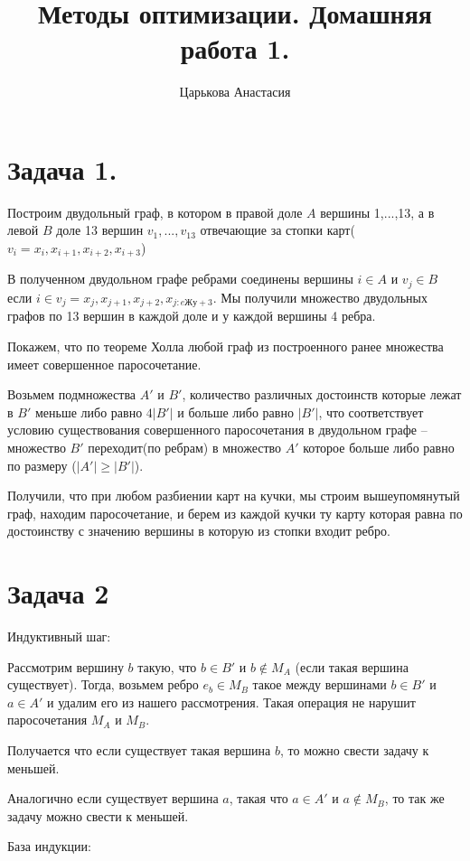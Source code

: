 \documentclass{article}
\title{\vspace{-2em}Методы оптимизации. Домашняя работа 1.}
\author{Царькова Анастасия}
\date{}
\begin{document}
\maketitle

\section{Задача 1.}

Построим двудольный граф, в котором в правой доле $A$ вершины 1,...,13, а в левой $B$ доле 13 вершин $v_1,...,v_{13}$ отвечающие за стопки карт($v_i = {x_i, x_{i+1}, x_{i+2}, x_{i+3}}$)

В полученном двудольном графе ребрами соединены вершины $i \in A$ и $v_j \in B$ если $i \in v_j = {x_j, x_{j+1}, x_{j+2}, x_{j:eЖу
+3}}$.
Мы получили множество двудольных графов по 13 вершин в каждой доле и у каждой вершины 4 ребра.

Покажем, что по теореме Холла любой граф из построенного ранее множества имеет совершенное паросочетание.

Возьмем подмножества $A'$ и $B'$, количество различных достоинств которые лежат в $B'$ меньше либо равно $4|B'|$ и больше либо равно $|B'|$, что соответствует условию существования совершенного паросочетания в двудольном графе -- множество $B'$ переходит(по ребрам) в множество $A'$ которое больше либо равно по размеру ($|A'| \geq |B'|$).


Получили, что при любом разбиении карт на кучки, мы строим вышеупомянутый граф, находим паросочетание, и берем из каждой кучки ту карту которая равна по достоинству с значению вершины в которую из стопки входит ребро.

\section{Задача 2}

Индуктивный шаг:

Рассмотрим вершину $b$ такую, что $b \in B'$ и $b \notin M_A$ (если такая вершина существует). Тогда, возьмем ребро $e_b \in M_B$ такое между вершинами $b\in B'$ и $a \in A'$ и удалим его из нашего рассмотрения. Такая операция не нарушит паросочетания $M_A$ и $M_B$.

Получается что если существует такая вершина $b$, то можно свести задачу к меньшей.

Аналогично если существует вершина $a$, такая что $a \in A'$ и $a \notin M_B$, то так же задачу можно свести к меньшей.

База индукции:
\end{document}
